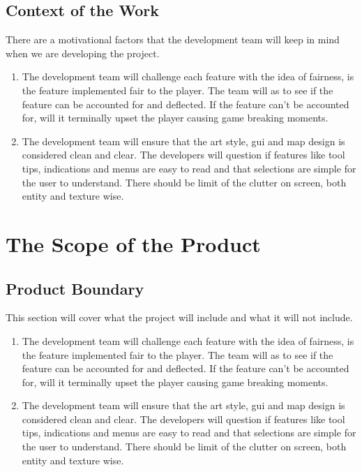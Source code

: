 \documentclass{article}
\begin{document}
\subsection{Context of the Work}
\quad There are a motivational factors that the development team will keep in mind when we are developing the project.
\begin{enumerate}[{CW}1. ]
	\item The development team will challenge each feature with the idea of fairness, is the feature implemented fair to the player. The team will as to see if the feature can be accounted for and deflected. If the feature can't be accounted for, will it terminally upset the player causing game breaking moments.
	\item The development team will ensure that the art style, gui and map design is considered clean and clear. The developers will question if features like tool tips, indications and menus are easy to read and that selections are simple for the user to understand.  There should be limit of the clutter on screen, both entity and texture wise.
\end{enumerate}
\section{The Scope of the Product}
\subsection{Product Boundary}
\quad This section will cover what the project will include and what it will not include.
\begin{enumerate}[{PB}1. ]
	\item The development team will challenge each feature with the idea of fairness, is the feature implemented fair to the player. The team will as to see if the feature can be accounted for and deflected. If the feature can't be accounted for, will it terminally upset the player causing game breaking moments.
	\item The development team will ensure that the art style, gui and map design is considered clean and clear. The developers will question if features like tool tips, indications and menus are easy to read and that selections are simple for the user to understand.  There should be limit of the clutter on screen, both entity and texture wise.
\end{enumerate}
\end{document}
